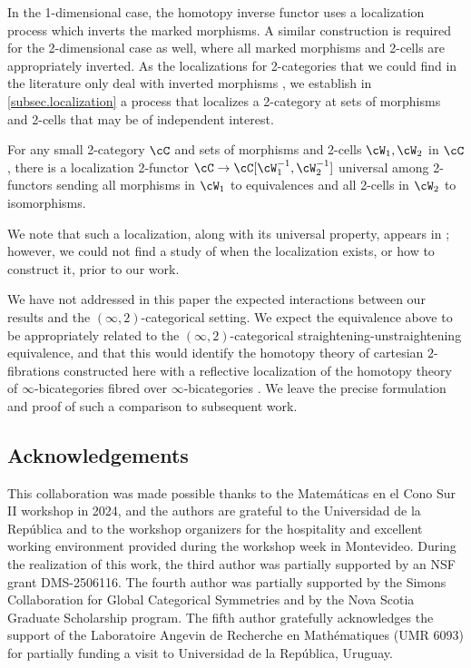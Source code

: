 \documentclass[11pt, dvipsnames]{amsart}
\begin{document}
In the 1-dimensional case, the homotopy inverse functor uses a localization process which inverts the marked morphisms. A similar construction is required for the 2-dimensional case as well, where all marked morphisms and 2-cells are appropriately inverted. As the localizations for 2-categories that we could find in the literature only deal with inverted morphisms \cite{local1,pronk1996etendues,local3}, we establish in \cref{subsec.localization} a process that localizes a 2-category at sets of morphisms and 2-cells that may be of independent interest. 
\begin{theoremA}
      For any small 2-category $\cC$ and sets of morphisms and 2-cells $\cW_1,\cW_2$ in $\cC$, there is a localization 2-functor $\cC\to\cC[\cW_1^{-1},\cW_2^{-1}]$ universal among 2-functors sending all morphisms in $\cW_1$ to equivalences and all 2-cells in $\cW_2$ to isomorphisms.
\end{theoremA}
We note that such a localization, along with its universal property, appears in \cite[Definition 3.1]{vazquez2021three}; however, we could not find a study of when the localization exists, or how to construct it, prior to our work.  

We have not addressed in this paper the expected interactions between our results and the $(\infty,2)$-categorical setting. We expect the equivalence above to be appropriately related to the $(\infty,2)$-categorical straightening-unstraightening equivalence, and that this would identify the homotopy theory of cartesian $2$-fibrations constructed here with a reflective localization of the
homotopy theory of $\infty$-bicategories fibred over $\infty$-bicategories \cite{garcia2CartesianFibrationsModel2021, abellan2CartesianFibrationsII2023, gagnaEquivalenceAllModels2022}. We leave the precise formulation and proof of such a comparison to subsequent work.


\subsection*{Acknowledgements} 
	This collaboration was made possible thanks to the Matem\'aticas en el Cono Sur II workshop in 2024, and the authors are grateful to the Universidad de la República and to the workshop organizers for the hospitality and excellent working environment provided during the workshop week in Montevideo. During the realization of this work, the third author was partially supported by an NSF grant DMS-2506116.  The fourth author was partially supported by the Simons Collaboration for Global Categorical Symmetries and by the Nova Scotia Graduate Scholarship program. The fifth author gratefully acknowledges the support of the Laboratoire Angevin de Recherche en Mathématiques (UMR 6093) for partially funding a visit to Universidad de la República, Uruguay. 
\end{document}
